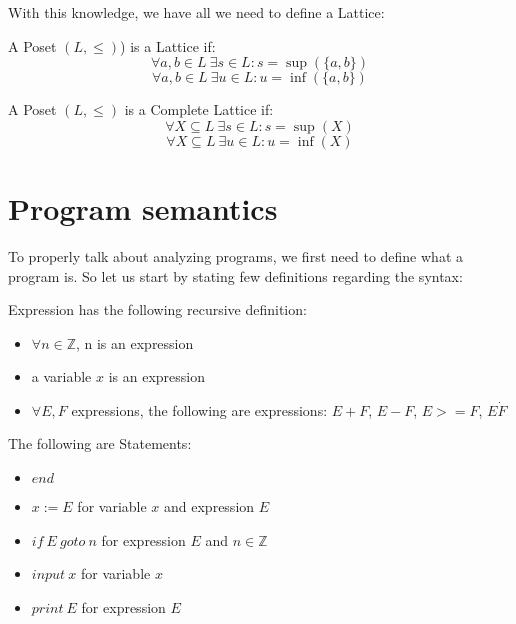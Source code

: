 With this knowledge, we have all we need to define a Lattice:
\begin{defn}[Lattice]
    A Poset $(L, \leq)$) is a Lattice if:
    \[\forall a, b \in L \: \exists s \in L: s = \sup(\{a,b\})\]
    \[\forall a, b \in L \: \exists u \in L: u = \inf(\{a,b\})\]
\end{defn}


\begin{defn}
    A Poset $(L, \leq)$ is a Complete Lattice if:
    \[\forall X \subseteq L \: \exists s \in L: s = \sup(X)\]
    \[\forall X \subseteq L \: \exists u \in L: u = \inf(X)\]
\end{defn}




\section{Program semantics} %

To properly talk about analyzing programs, we first need to define what a program is.
So let us start by stating few definitions regarding the syntax:

\begin{defn}[Expression]
    Expression has the following recursive definition:
    \begin{itemize}
        \item $\forall n \in \mathbb{Z}$, n is an expression
        \item a variable $x$ is an expression
        \item $\forall E, F$ expressions, the following are expressions: $E+F$, $E-F$, $E>=F$, $E \dot F$
    \end{itemize}
\end{defn}

\begin{defn}[Statement]
    The following are Statements:
    \begin{itemize}
        \item $end$
        \item $x := E$ for variable $x$ and expression $E$
        \item $if \: E \: goto \: n$ for expression $E$ and $n \in \mathbb{Z}$
        \item $input \: x$ for variable $x$
        \item $print \: E$ for expression $E$
    \end{itemize}
\end{defn}

